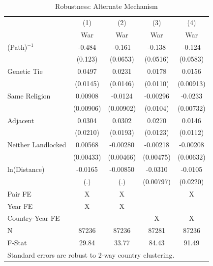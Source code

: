 \documentclass{article}
\begin{document}
\begin{table}[htbp]\centering
\caption{Robustness: Alternate Mechanism \label{tab:RCRobust}}
\begin{tabular}{l*{4}{c}}
\toprule
                    &\multicolumn{1}{c}{(1)}&\multicolumn{1}{c}{(2)}&\multicolumn{1}{c}{(3)}&\multicolumn{1}{c}{(4)}\\
                    &\multicolumn{1}{c}{War}&\multicolumn{1}{c}{War}&\multicolumn{1}{c}{War}&\multicolumn{1}{c}{War}\\
\midrule
(Path)$^{-1}$       &      -0.484&      -0.161&      -0.138&      -0.124\\
                    &     (0.123)&    (0.0653)&    (0.0516)&    (0.0583)\\
\addlinespace
Genetic Tie         &      0.0497&      0.0231&      0.0178&      0.0156\\
                    &    (0.0145)&    (0.0146)&    (0.0110)&   (0.00913)\\
\addlinespace
Same Religion       &     0.00908&     -0.0124&    -0.00296&     -0.0233\\
                    &   (0.00906)&   (0.00902)&    (0.0104)&   (0.00732)\\
\addlinespace
Adjacent            &      0.0304&      0.0302&      0.0270&      0.0146\\
                    &    (0.0210)&    (0.0193)&    (0.0123)&    (0.0112)\\
\addlinespace
Neither Landlocked  &     0.00568&    -0.00280&    -0.00218&    -0.00208\\
                    &   (0.00433)&   (0.00466)&   (0.00475)&   (0.00632)\\
\addlinespace
ln(Distance)        &     -0.0165&    -0.00850&     -0.0310&     -0.0105\\
                    &         (.)&         (.)&   (0.00797)&    (0.0220)\\
\midrule
Pair FE             &           X&           X&            &           X\\
Year FE             &           X&           X&            &            \\
Country-Year FE     &            &            &           X&           X\\
N                   &       87236&       87236&       87281&       87236\\
F-Stat              &       29.84&       33.77&       84.43&       91.49\\
\bottomrule
\multicolumn{5}{l}{\footnotesize Standard errors are robust to 2-way country clustering.}\\
\end{tabular}
\end{table}
\end{document}
